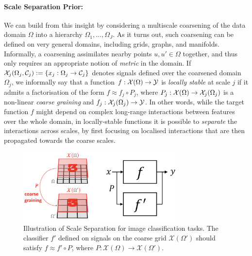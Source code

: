 \paragraph{Scale Separation Prior: }
We can build from this insight by considering a multiscale coarsening of the data domain $\Omega$ into a hierarchy $\Omega_1, \hdots, \Omega_J$. 
As it turns out, such coarsening can be defined on very general domains, including grids, graphs, and manifolds. 
Informally, a coarsening assimilates nearby points $u, u' \in \Omega$ together, and thus only requires an appropriate notion of {\em metric} in the domain. 
If ${\mathcal{X}}_{j}(\Omega_j,\mathcal{C}_j) := \{x_j: \Omega_j \to \mathcal{C}_j \}$ 
denotes signals defined over the coarsened domain $\Omega_j$, we informally say that a function $f : {\mathcal{X}}(\Omega) \to {\mathcal{Y}}$ is \emph{locally stable} at scale $j$ if it admits a factorisation of the form $f \approx f_j \circ P_j $, where $P_j : {\mathcal{X}}(\Omega) \to {\mathcal{X}}_{j}(\Omega_j)$ is a non-linear \emph{coarse graining} and $f_j : {\mathcal{X}}_{j}(\Omega_j) \to {\mathcal{Y}}$. In other words, while the target function $f$ might depend on complex long-range interactions between features over the whole domain, in locally-stable functions it is possible to \emph{separate} the interactions across scales, by first focusing on localised interactions that are then propagated towards the coarse scales. 

\begin{figure}
    \centering
    \includegraphics[width=0.75\textwidth]{figures/scale_sep.png}%
    \caption{Illustration of Scale Separation for image classification tasks. The classifier $f'$ defined on signals on the coarse grid $\mathcal{X}(\Omega')$ should satisfy $f \approx f'\circ P$, where $P: \mathcal{X}(\Omega) \rightarrow \mathcal{X}(\Omega')$. }
    \label{fig:scale_separation}
\end{figure}

